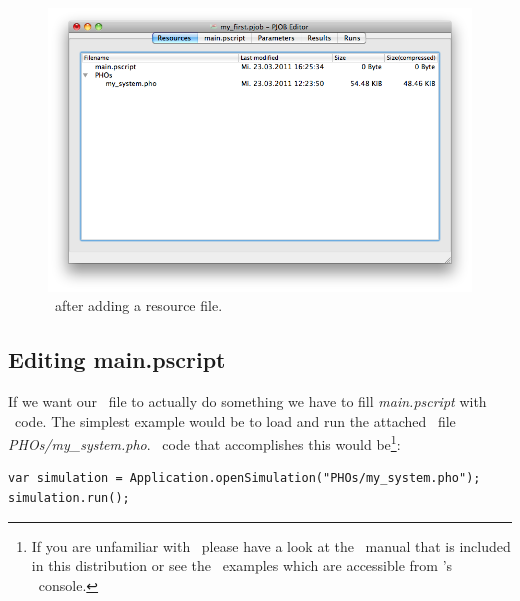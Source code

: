 \begin{figure}[h!]
\includegraphics[width=\textwidth]{Screenshots/PJobEditor/pho_added.png}
\caption{\pjobeditor\ after adding a resource file.}
\label{editor:pho_added}
\end{figure}



\subsection{Editing main.pscript}
If we want our \PJOB\ file to actually do something
we have to fill \textit{main.pscript} with \PS\ code.
The simplest example would be to load and run the attached \pho\ file \textit{PHOs/my\_system.pho}.
\PS\ code that accomplishes this would be\footnote{If you are unfamiliar with \PS\
please have a look at the \PS\ manual that is included in this distribution
or see the \PS\ examples which are accessible from \PHO's \PS\ console.}:
\begin{lstlisting}
var simulation = Application.openSimulation("PHOs/my_system.pho");
simulation.run();
\end{lstlisting}

